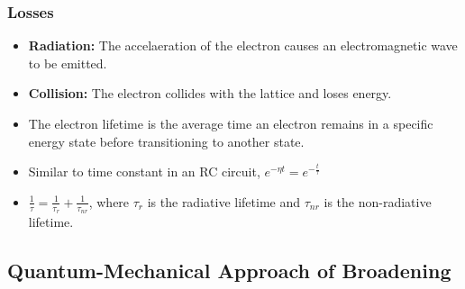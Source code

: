 \documentclass[11pt]{article}
\begin{document}
\subsubsection{Losses}
\begin{itemize}
    \item \textbf{Radiation:} The accelaeration of the electron causes an electromagnetic wave to be emitted.
    \item \textbf{Collision:} The electron collides with the lattice and loses energy.
    \item The electron lifetime is the average time an electron remains in a specific energy state before transitioning to another state.
    \item Similar to time constant in an RC circuit, $e^{-\eta t} = e^{-\frac{t}{\tau}}$ 
    \item $\frac{1}{\tau} = \frac{1}{\tau_r} + \frac{1}{\tau_{nr}}$, where $\tau_r$ is the radiative lifetime and $\tau_{nr}$ is the non-radiative lifetime.
\end{itemize}

\subsection{Quantum-Mechanical Approach of Broadening}
\end{document}
